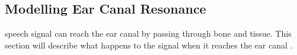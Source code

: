 % 
% 
% 
% 

\subsection{Modelling Ear Canal Resonance}
\DIFdelbegin {}\DIFdelend \DIFaddbegin {}\DIFaddend speech signal can reach the ear canal by passing through \DIFaddbegin {}\DIFaddend bone and tissue.  This section will describe what happens to the signal when it reaches the ear canal \DIFaddbegin {}\DIFaddend . 

